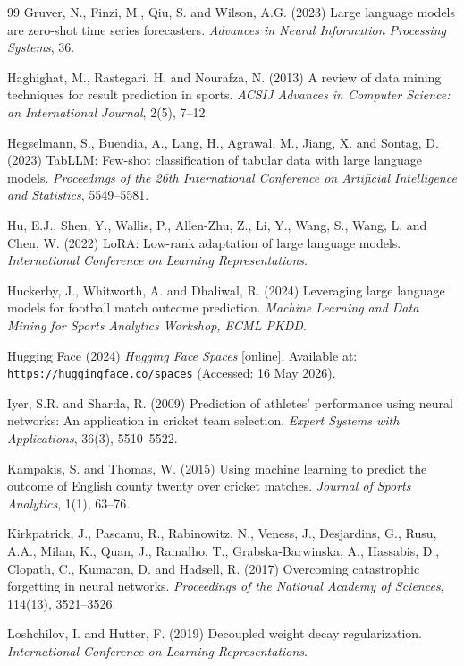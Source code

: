 \documentclass[12pt, oneside]{report}
\begin{document}
\begin{thebibliography}{99}
Gruver, N., Finzi, M., Qiu, S. and Wilson, A.G. (2023)
Large language models are zero-shot time series forecasters.
\textit{Advances in Neural Information Processing Systems}, 36.

Haghighat, M., Rastegari, H. and Nourafza, N. (2013)
A review of data mining techniques for result prediction in sports.
\textit{ACSIJ Advances in Computer Science: an International Journal}, 2(5), 7--12.

Hegselmann, S., Buendia, A., Lang, H., Agrawal, M., Jiang, X. and Sontag, D. (2023)
TabLLM: Few-shot classification of tabular data with large language models.
\textit{Proceedings of the 26th International Conference on Artificial Intelligence and Statistics}, 5549--5581.

Hu, E.J., Shen, Y., Wallis, P., Allen-Zhu, Z., Li, Y., Wang, S., Wang, L. and Chen, W. (2022)
LoRA: Low-rank adaptation of large language models.
\textit{International Conference on Learning Representations}.

Huckerby, J., Whitworth, A. and Dhaliwal, R. (2024)
Leveraging large language models for football match outcome prediction.
\textit{Machine Learning and Data Mining for Sports Analytics Workshop, ECML PKDD}.

Hugging Face (2024)
\textit{Hugging Face Spaces} [online].
Available at: \texttt{https://huggingface.co/spaces} (Accessed: 16 May 2026).

Iyer, S.R. and Sharda, R. (2009)
Prediction of athletes' performance using neural networks: An application in cricket team selection.
\textit{Expert Systems with Applications}, 36(3), 5510--5522.

Kampakis, S. and Thomas, W. (2015)
Using machine learning to predict the outcome of English county twenty over cricket matches.
\textit{Journal of Sports Analytics}, 1(1), 63--76.

Kirkpatrick, J., Pascanu, R., Rabinowitz, N., Veness, J., Desjardins, G., Rusu, A.A., Milan, K., Quan, J., Ramalho, T., Grabska-Barwinska, A., Hassabis, D., Clopath, C., Kumaran, D. and Hadsell, R. (2017)
Overcoming catastrophic forgetting in neural networks.
\textit{Proceedings of the National Academy of Sciences}, 114(13), 3521--3526.

Loshchilov, I. and Hutter, F. (2019)
Decoupled weight decay regularization.
\textit{International Conference on Learning Representations}.


\end{thebibliography}
\end{document}

